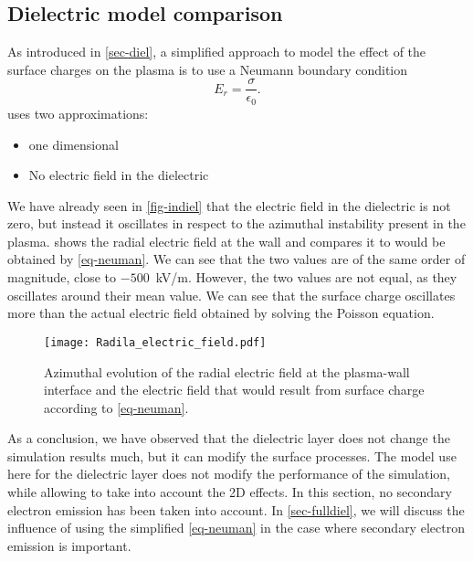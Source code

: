     
  \subsection{Dielectric model comparison} \label{subsec-modelcomp}
  
  
  As introduced in \cref{sec-diel}, a simplified approach to model the effect of the surface charges on the plasma is to use a Neumann boundary condition \citep{taccogna2019}
  \begin{equation} \label{eq-neuman}
    E_r = \frac{\sigma}{\epsilon_0}.
  \end{equation}
   uses two approximations\string:
  \begin{itemize}
    \item one dimensional
    \item No electric field in the dielectric
  \end{itemize}
  We have already seen in \cref{fig-indiel} that the electric field in the dielectric is not zero, but instead it oscillates in respect to the azimuthal instability present in the plasma.  
   shows the radial electric field at the wall and compares it to would be obtained by \cref{eq-neuman}.
  We can see that the two values are of the same order of magnitude, close to $-500$~kV/m.
  However, the two values are not equal, as they oscillates around their mean value.
  We can see that the surface charge oscillates more than the actual electric field obtained by solving the Poisson equation.

\begin{figure}[hbt]
  \centering
  \texttt{[image: Radila\_electric\_field.pdf]}
  \caption{Azimuthal evolution of the radial electric field at the plasma-wall interface and the electric field that would result from surface charge according to \cref{eq-neuman}.}
  \label{fig-spacial_comparaison}
\end{figure}
\renewcommand\subfigurewidth{0.45\textwidth}

  As a conclusion, we have observed that the dielectric layer does not change the simulation results much, but it can modify the surface processes.
  The model use here for the dielectric layer does not modify the performance of the simulation, while allowing to take into account the \ac{2D} effects.
  In this section, no secondary electron emission has been taken into account.
  In \cref{sec-fulldiel}, we will discuss the influence of using the simplified \cref{eq-neuman} in the case where secondary electron emission is important.

  
